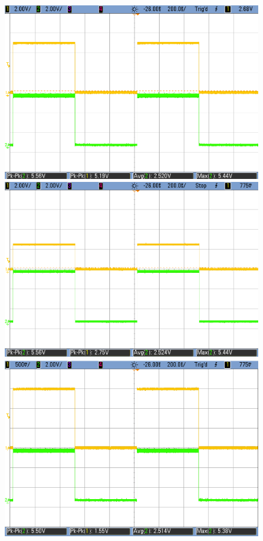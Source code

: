     \begin{figure}[h!]
        \centering
        \includegraphics[scale=0.19]{LS-HC-5V.png}\hspace{1cm}
        \includegraphics[scale=0.19]{LS-HC-3V.png}\\
		\vspace{0.2cm}
        \includegraphics[scale=0.19]{LS-HC-1p5V.png}\hspace{1cm}

\end{figure}
